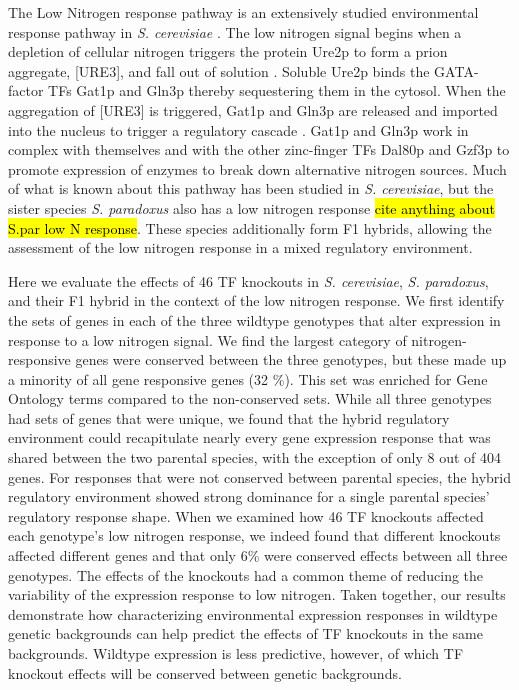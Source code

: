 The Low Nitrogen response pathway is an extensively studied environmental response pathway in \textit{S. cerevisiae} \cite{Magasanik2005}. The low nitrogen signal begins when a depletion of cellular nitrogen triggers the protein Ure2p to form a prion aggregate, [URE3], and fall out of solution \cite{Wickner1994}. Soluble Ure2p binds the GATA-factor TFs Gat1p and Gln3p thereby sequestering them in the cytosol. When the aggregation of [URE3] is triggered, Gat1p and Gln3p are released and imported into the nucleus to trigger a regulatory cascade \cite{Zhang2018}. Gat1p and Gln3p work in complex with themselves and with the other zinc-finger TFs Dal80p and Gzf3p to promote expression of enzymes to break down alternative nitrogen sources. Much of what is known about this pathway has been studied in \textit{S. cerevisiae}, but the sister species \textit{S. paradoxus} also has a low nitrogen response \hl{cite anything about S.par low N response}. These species additionally form F1 hybrids, allowing the assessment of the low nitrogen response in a mixed regulatory environment. 

Here we evaluate the effects of 46 TF knockouts in \textit{S. cerevisiae}, \textit{S. paradoxus}, and their F1 hybrid in the context of the low nitrogen response. We first identify the sets of genes in each of the three wildtype genotypes that alter expression in response to a low nitrogen signal. We find the largest category of nitrogen-responsive genes were conserved between the three genotypes, but these made up a minority of all gene responsive genes (32 \%). This set was enriched for Gene Ontology terms compared to the non-conserved sets. While all three genotypes had sets of genes that were unique, we found that the hybrid regulatory environment could recapitulate nearly every gene expression response that was shared between the two parental species, with the exception of only 8 out of 404 genes. For responses that were not conserved between parental species, the hybrid regulatory environment showed strong dominance for a single parental species' regulatory response shape. When we examined how 46 TF knockouts affected each genotype's low nitrogen response, we indeed found that different knockouts affected different genes and that only 6\% were conserved effects between all three genotypes. The effects of the knockouts had a common theme of reducing the variability of the expression response to low nitrogen. Taken together, our results demonstrate how characterizing environmental expression responses in wildtype genetic backgrounds can help predict the effects of TF knockouts in the same backgrounds. Wildtype expression is less predictive, however, of which TF knockout effects will be conserved between genetic backgrounds.

